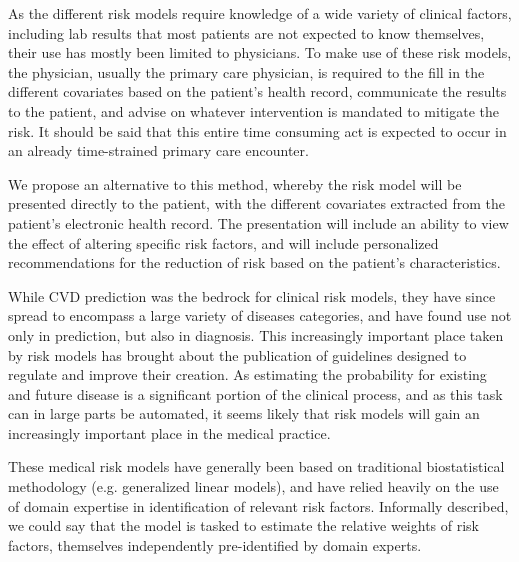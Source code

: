 \documentclass[a4paper,12pt]{article}
\begin{document}
	As the different risk models require knowledge of a wide variety of clinical factors, including lab results that most patients are not expected to know themselves, their use has mostly been limited to physicians. To make use of these risk models, the physician, usually the primary care physician, is required to the fill in the different covariates based on the patient's health record, communicate the results to the patient, and advise on whatever intervention is mandated to mitigate the risk. It should be said that this entire time consuming act is expected to occur in an already time-strained primary care encounter\cite{Konrad2010}.
	
	We propose an alternative to this method, whereby the risk model will be presented directly to the patient, with the different covariates extracted from the patient's electronic health record. The presentation will include an ability to view the effect of altering specific risk factors, and will include personalized recommendations for the reduction of risk based on the patient's characteristics.
	
	While CVD prediction was the bedrock for clinical risk models, they have since spread to encompass a large variety of diseases categories\cite{Kanis2008,Kansagara2011}, and have found use not only in prediction, but also in diagnosis\cite{Usher-Smith2016}. This increasingly important place taken by risk models has brought about the publication of guidelines designed to regulate and improve their creation\cite{Collins2015}. As estimating the probability for existing and future disease is a significant portion of the clinical process\cite{Moons2009}, and as this task can in large parts be automated, it seems likely that risk models will gain an increasingly important place in the medical practice.
	
	These medical risk models have generally been based on traditional biostatistical methodology (e.g. generalized linear models), and have relied heavily on the use of domain expertise in identification of relevant risk factors\cite{Weng2017}. Informally described, we could say that the model is tasked to estimate the relative weights of risk factors, themselves independently pre-identified by domain experts.
	
\end{document}
